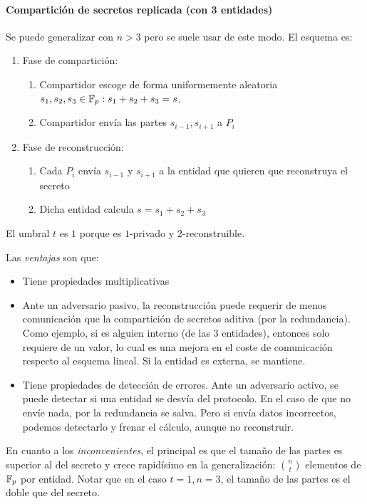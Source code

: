   \paragraph{Compartición de secretos replicada (con 3 entidades)}
  Se puede generalizar con $n > 3$ pero se suele usar de este modo.
  El esquema es:
  \begin{enumerate}
    \item Fase de compartición:
      \begin{enumerate}
        \item Compartidor escoge de forma uniformemente aleatoria $s_1,s_2,s_3\in\mathbb{F}_p : s_1+s_2+s_3=s$.
        \item Compartidor envía las partes $s_{i-1},s_{i+1}$ a $P_i$
      \end{enumerate}
    \item Fase de reconstrucción:
      \begin{enumerate}
        \item Cada $P_i$ envía $s_{i-1}$ y $s_{i+1}$ a la entidad que quieren que reconstruya el secreto 
        \item Dicha entidad calcula $s=s_1+s_2+s_3$
      \end{enumerate}
  \end{enumerate}
  \begin{remark}
    El umbral $t$ es $1$ porque es $1$-privado y $2$-reconstruible.
  \end{remark}

  Las \textit{ventajas} son que:
  \begin{itemize}
    \item Tiene propiedades multiplicativas 
    \item Ante un adversario pasivo, la reconstrucción puede requerir de menos comunicación 
      que la compartición de secretos aditiva (por la redundancia).
      Como ejemplo, si es alguien interno (de las $3$ entidades), entonces solo requiere de 
      un valor, lo cual es una mejora en el coste de comunicación respecto al esquema lineal.
      Si la entidad es externa, se mantiene.
    \item Tiene propiedades de detección de errores.
      Ante un adversario activo, se puede detectar si una entidad se desvía del protocolo.
      En el caso de que no envíe nada, por la redundancia se salva.
      Pero si envía datos incorrectos, podemos detectarlo y frenar el cálculo, aunque no 
      reconstruir.
  \end{itemize}
  En cuanto a los \textit{inconvenientes}, el principal es que el tamaño de las partes es 
  superior al del secreto y crece rapidísimo en la  generalización:
  $\binom{n}{t}$ elementos de $\mathbb{F}_p$ por entidad.
  Notar que en el caso $t=1,n=3$, el tamaño de las partes es el doble que del secreto.

